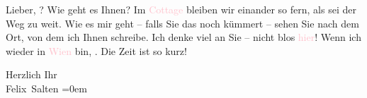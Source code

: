 \pstart
           Lieber,{ }\label{K_L03596-1v}\label{K_L03596-1h}? Wie geht es Ihnen? Im \textcolor{pink}{Cottage}{}\ledrightnote{\textcolor{pink}{Währinger Cottage}} bleiben wir einander so fern, als sei der Weg zu weit.
               Wie es mir geht – falls Sie das noch kümmert – sehen Sie nach dem Ort, von dem ich
               Ihnen schreibe. Ich denke viel an Sie – nicht blos \textcolor{pink}{hier}{}\ledrightnote{{$\rightarrow$}\textcolor{pink}{Loschwitz}}! Wenn ich wieder in \textcolor{pink}{Wien}{}\ledrightnote{\textcolor{pink}{Wien}} bin, \label{K_L03596-2v}\label{K_L03596-2h}. Die Zeit ist so kurz!\pend
           
\pstart
           Herzlich Ihr {\\[\baselineskip]}\spacefill\mbox{Felix Salten}\pend
           \leftskip=0em{}\endnumbering{}  
      